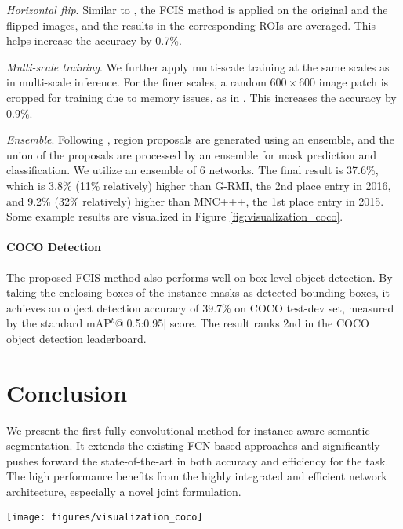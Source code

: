 \documentclass[10pt,twocolumn,letterpaper]{article}
\begin{document}
\emph{Horizontal flip}. Similar to \cite{zagoruyko2016multipath}, the FCIS method is applied on the original and the flipped images, and the results in the corresponding ROIs are averaged. This helps increase the accuracy by 0.7\%. 

\emph{Multi-scale training}. We further apply multi-scale training at the same scales as in multi-scale inference. For the finer scales, a random $600\times600$ image patch is cropped for training due to memory issues, as in \cite{liu2016ssd}. This increases the accuracy by 0.9\%. 

\emph{Ensemble}. Following \cite{he2016deep}, region proposals are generated using an ensemble, and the union of the proposals are processed by an ensemble for mask prediction and classification. We utilize an ensemble of 6 networks. The final result is 37.6\%, which is 3.8\% (11\% relatively) higher than G-RMI, the 2nd place entry in 2016, and 9.2\% (32\% relatively) higher than MNC+++, the 1st place entry in 2015. Some example results are visualized in Figure \ref{fig:visualization_coco}.

\paragraph{COCO Detection} The proposed FCIS method also performs well on box-level object detection. By taking the enclosing boxes of the instance masks as detected bounding boxes, it achieves an object detection accuracy of 39.7\% on COCO test-dev set, measured by the standard mAP$^b$@[0.5:0.95] score. The result ranks 2nd in the COCO object detection leaderboard.

\section{Conclusion}
We present the first fully convolutional method for instance-aware semantic segmentation. It extends the existing FCN-based approaches and significantly pushes forward the state-of-the-art in both accuracy and efficiency for the task. The high performance benefits from the highly integrated and efficient network architecture, especially a novel joint formulation.


\begin{figure*}
\centering
\texttt{[image: figures/visualization\_coco]}
\caption{Example instance-aware semantic segmentation results of the proposed FCIS method on COCO test set. Check \url{https://github.com/daijifeng001/TA-FCN} for example results on the first 5k images on COCO test set.}
\label{fig:visualization_coco}
\end{figure*}



{\small


}
\end{document}
